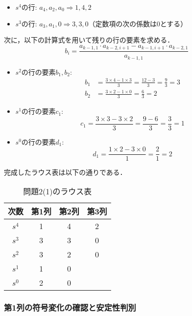 \documentclass[11pt,a4paper]{ltjsarticle}
\begin{document}
\begin{itemize}
\item $s^4$の行: $a_4, a_2, a_0 \Rightarrow 1, 4, 2$
\item $s^3$の行: $a_3, a_1, 0 \Rightarrow 3, 3, 0$（定数項の次の係数は0とする）
\end{itemize}

次に，以下の計算式を用いて残りの行の要素を求める．
\begin{equation}
b_i = \frac{a_{k-1,1} \cdot a_{k-2,i+1} - a_{k-1,i+1} \cdot a_{k-2,1}}{a_{k-1,1}}
\end{equation}

\begin{itemize}
\item $s^2$の行の要素$b_1, b_2$:
  \begin{align}
  b_1 &= \frac{3 \times 4 - 1 \times 3}{3} = \frac{12-3}{3} = \frac{9}{3} = 3 \\
  b_2 &= \frac{3 \times 2 - 1 \times 0}{3} = \frac{6}{3} = 2
  \end{align}
\item $s^1$の行の要素$c_1$:
  \begin{equation}
  c_1 = \frac{3 \times 3 - 3 \times 2}{3} = \frac{9-6}{3} = \frac{3}{3} = 1
  \end{equation}
\item $s^0$の行の要素$d_1$:
  \begin{equation}
  d_1 = \frac{1 \times 2 - 3 \times 0}{1} = \frac{2}{1} = 2
  \end{equation}
\end{itemize}

完成したラウス表は以下の通りである．

\begin{table}[h]
\centering
\caption{問題2(1)のラウス表}
\label{tbl:routh1}
\begin{tabular}{cccc}
\toprule
次数 & 第1列 & 第2列 & 第3列 \\
\midrule
$s^4$ & 1 & 4 & 2 \\
$s^3$ & 3 & 3 & 0 \\
$s^2$ & 3 & 2 & 0 \\
$s^1$ & 1 & 0 & \\
$s^0$ & 2 & 0 & \\
\bottomrule
\end{tabular}
\end{table}

\subsubsection{第1列の符号変化の確認と安定性判別}
\end{document}
